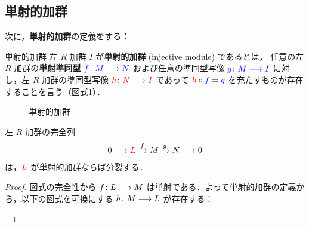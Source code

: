 \documentclass[algtopo_main]{subfiles}
\begin{document}
\subsection{単射的加群}

次に，\textbf{単射的加群}の定義をする：
\begin{mydef}[label=def:inj-mod]{単射的加群}
    左 $R$ 加群 $I$ が\textbf{単射的加群} (injective module) であるとは，
    任意の左 $R$ 加群の\textbf{単射準同型} $\textcolor{blue}{f\colon M \longrightarrow N}$ および任意の準同型写像 $\textcolor{blue}{g \colon M \longrightarrow I}$ に対し，左 $R$ 加群の準同型写像 $\textcolor{red}{h \colon N \longrightarrow I}$ であって $\textcolor{red}{h} \circ \textcolor{blue}{f} = \textcolor{blue}{g}$ を充たすものが存在することを言う（図式\ref{fig:inj-mod}）．
\end{mydef}

\begin{figure}[H]
    \centering
    \caption{単射的加群}
    \label{fig:inj-mod}
\end{figure}%

\begin{myprop}[label=prop:inj-mod-split]{}
    左 $R$ 加群の完全列
    \begin{align}
        0 \longrightarrow \textcolor{red}{L}\xrightarrow{f} M \xrightarrow{g} N \longrightarrow 0
    \end{align}
    は，$\textcolor{red}{L}$ が\hyperref[def:inj-mod]{単射的加群}ならば\hyperref[def:split]{分裂}する．
\end{myprop}

\begin{proof}
    図式の完全性から $f \colon L \longrightarrow M$ は単射である．よって\hyperref[def:inj-mod]{単射的加群}の定義から，以下の図式を可換にする $h \colon M \longrightarrow L$ が存在する：
    \begin{center}
    \end{center}
\end{proof}
\end{document}
